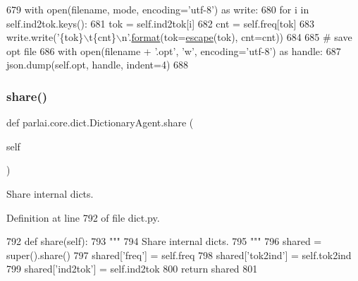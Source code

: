 \begin{DoxyCode}
679         with open(filename, mode, encoding=\textcolor{stringliteral}{'utf-8'}) \textcolor{keyword}{as} write:
680             \textcolor{keywordflow}{for} i \textcolor{keywordflow}{in} self.ind2tok.keys():
681                 tok = self.ind2tok[i]
682                 cnt = self.freq[tok]
683                 write.write(\textcolor{stringliteral}{'\{tok\}\(\backslash\)t\{cnt\}\(\backslash\)n'}.\hyperlink{namespaceparlai_1_1chat__service_1_1services_1_1messenger_1_1shared__utils_a32e2e2022b824fbaf80c747160b52a76}{format}(tok=\hyperlink{namespaceparlai_1_1core_1_1dict_ae44fe4a2be005a4023a758a58f656495}{escape}(tok), cnt=cnt))
684 
685         \textcolor{comment}{# save opt file}
686         with open(filename + \textcolor{stringliteral}{'.opt'}, \textcolor{stringliteral}{'w'}, encoding=\textcolor{stringliteral}{'utf-8'}) \textcolor{keyword}{as} handle:
687             json.dump(self.opt, handle, indent=4)
688 
\end{DoxyCode}
\mbox{\label{classparlai_1_1core_1_1dict_1_1DictionaryAgent_a3d8996e367685451f7de85e8284243d7}} 
\subsubsection{\texorpdfstring{share()}{share()}}
{\footnotesize\ttfamily def parlai.\+core.\+dict.\+Dictionary\+Agent.\+share (\begin{DoxyParamCaption}\item[{}]{self }\end{DoxyParamCaption})}

\begin{DoxyVerb}Share internal dicts.
\end{DoxyVerb}
 

Definition at line 792 of file dict.\+py.


\begin{DoxyCode}
792     \textcolor{keyword}{def }share(self):
793         \textcolor{stringliteral}{"""}
794 \textcolor{stringliteral}{        Share internal dicts.}
795 \textcolor{stringliteral}{        """}
796         shared = super().share()
797         shared[\textcolor{stringliteral}{'freq'}] = self.freq
798         shared[\textcolor{stringliteral}{'tok2ind'}] = self.tok2ind
799         shared[\textcolor{stringliteral}{'ind2tok'}] = self.ind2tok
800         \textcolor{keywordflow}{return} shared
801 
\end{DoxyCode}
\mbox{\label{classparlai_1_1core_1_1dict_1_1DictionaryAgent_aea9aca40dd1bb1976f4042565b172d88}} 
